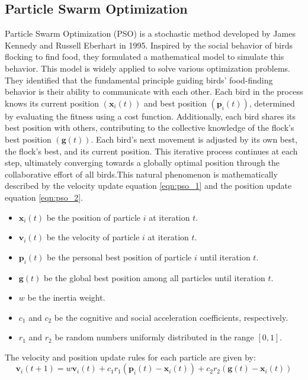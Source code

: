 \documentclass[paper,revised]{geophysics}
\begin{document}
\subsection{Particle Swarm Optimization}
Particle Swarm Optimization (PSO) is a stochastic method developed by James Kennedy and Russell Eberhart in 1995. Inspired by the social behavior of birds flocking to find food, they formulated a mathematical model to simulate this behavior. This model is widely applied to solve various optimization problems. They identified that the fundamental principle guiding birds' food-finding behavior is their ability to communicate with each other. Each bird in the process knows its current position \((\mathbf{x}_i(t))\) and best position \((\mathbf{p}_i(t))\), determined by evaluating the fitness using a cost function. Additionally, each bird shares its best position with others, contributing to the collective knowledge of the flock's best position \((\mathbf{g}(t))\). Each bird's next movement is adjusted by its own best, the flock's best, and its current position. This iterative process continues at each step, ultimately converging towards a globally optimal position through the collaborative effort of all birds.This natural phenomenon is mathematically described by the velocity update equation \ref{eqn:pso_1} and the position update equation \ref{eqn:pso_2}.
\begin{itemize}
	\item \( \mathbf{x}_i(t) \) be the position of particle \( i \) at iteration \( t \).
	\item \( \mathbf{v}_i(t) \) be the velocity of particle \( i \) at iteration \( t \).
	\item \( \mathbf{p}_i(t) \) be the personal best position of particle \( i \) until iteration \( t \).
	\item \( \mathbf{g}(t) \) be the global best position among all particles until iteration \( t \).
	\item \( w \) be the inertia weight.
	\item \( c_1 \) and \( c_2 \) be the cognitive and social acceleration coefficients, respectively.
	\item \( r_1 \) and \( r_2 \) be random numbers uniformly distributed in the range \([0, 1]\).
\end{itemize}

The velocity and position update rules for each particle are given by:
\begin{equation}	
	\mathbf{v}_i(t+1) = w \mathbf{v}_i(t) + c_1 r_1 (\mathbf{p}_i(t) - \mathbf{x}_i(t)) + c_2 r_2 (\mathbf{g}(t) - \mathbf{x}_i(t))	
	\label{eqn:pso_1}
\end{equation}
\end{document}
